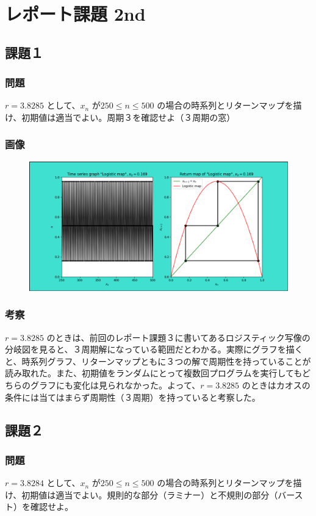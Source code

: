 \section{レポート課題 2nd}
\subsection{課題１}
\subsubsection{問題}
$r = 3.8285$ として、$x_n$ が$250 \leq n \leq 500$ の場合の時系列とリターンマップを描け、初期値は適当でよい。周期３を確認せよ（３周期の窓）
\subsubsection{画像}
\begin{figure}[htbp]
  \centering
  \includegraphics[keepaspectratio, scale=0.5]{images/Problem7/task7_1.png}
\end{figure}
\subsubsection{考察}
$r = 3.8285$ のときは、前回のレポート課題３に書いてあるロジスティック写像の分岐図を見ると、３周期解になっている範囲だとわかる。実際にグラフを描くと、時系列グラフ、リターンマップともに３つの解で周期性を持っていることが読み取れた。また、初期値をランダムにとって複数回プログラムを実行してもどちらのグラフにも変化は見られなかった。よって、$r = 3.8285$ のときはカオスの条件には当てはまらず周期性（３周期）を持っていると考察した。

\newpage
\subsection{課題２}
\subsubsection{問題}
$r = 3.8284$ として、$x_n$ が$250 \leq n \leq 500$ の場合の時系列とリターンマップを描け、初期値は適当でよい。規則的な部分（ラミナー）と不規則の部分（バースト）を確認せよ。
